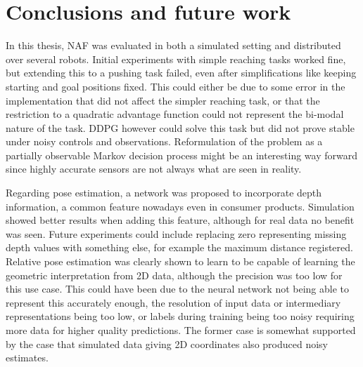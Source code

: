 \section{Conclusions and future work}

In this thesis, NAF was evaluated in both a simulated setting and distributed
over several robots. Initial experiments with simple reaching tasks worked
fine, but extending this to a pushing task failed, even after simplifications
like keeping starting and goal positions fixed. This could either be due to
some error in the implementation that did not affect the simpler reaching task,
or that the restriction to a quadratic advantage function could not represent
the bi-modal nature of the task. DDPG however could solve this task but did not
prove stable under noisy controls and observations. Reformulation of the
problem as a partially observable Markov decision process might be an
interesting way forward since highly accurate sensors are not always what are
seen in reality.

Regarding pose estimation, a network was proposed to incorporate depth
information, a common feature nowadays even in consumer products. Simulation
showed better results when adding this feature, although for real data no
benefit was seen. Future experiments could include replacing zero representing
missing depth values with something else, for example the maximum distance
registered. Relative pose estimation was clearly shown to learn to be capable
of learning the geometric interpretation from 2D data, although the precision
was too low for this use case. This could have been due to the neural network
not being able to represent this accurately enough, the resolution of input
data or intermediary representations being too low, or labels during training
being too noisy requiring more data for higher quality predictions. The former
case is somewhat supported by the case that simulated data giving 2D
coordinates also produced noisy estimates.

